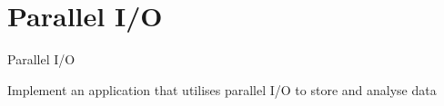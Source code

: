 \documentclass[compress,11pt,xcolor=svgnames,aspectratio=169]{beamer}
\begin{document}

\section{Parallel I/O}

\begin{frame}[fragile]{Parallel I/O}

Implement an application that utilises parallel I/O to store and analyse data

\end{frame}
\end{document}
